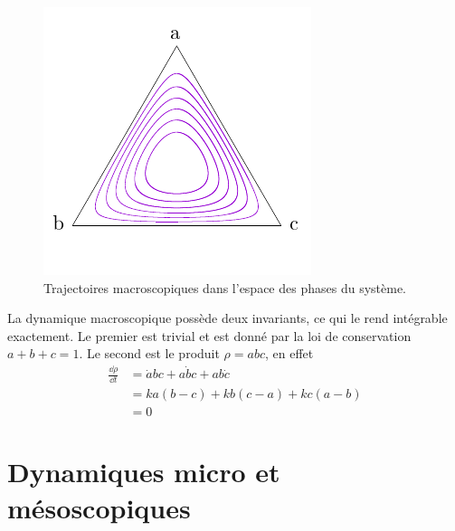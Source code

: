 \documentclass[openany,a4paper,12pt]{article}
\begin{document}
\begin{figure}
	\centering
	\includegraphics[width=0.7\linewidth]{figures/portrait}
	\caption{Trajectoires macroscopiques dans l'espace des phases du système.}
	\label{fig:portrait}
\end{figure}



\par La dynamique macroscopique possède deux invariants, ce qui le rend intégrable exactement. Le premier est trivial et est donné par la loi de conservation $a+b+c=1$. Le second est le produit $\rho = abc$, en effet
%
\begin{equation}\label{rho_invariant}
\begin{split}
	\frac{\dd \rho}{\dd t} 
	&= \dot a bc + a \dot b c + ab \dot c \\
	&= ka(b-c) + kb(c-a) + kc(a-b) \\
	&= 0
\end{split}
\end{equation}
%


\section{Dynamiques micro et mésoscopiques}
\label{section_micro}
\end{document}
